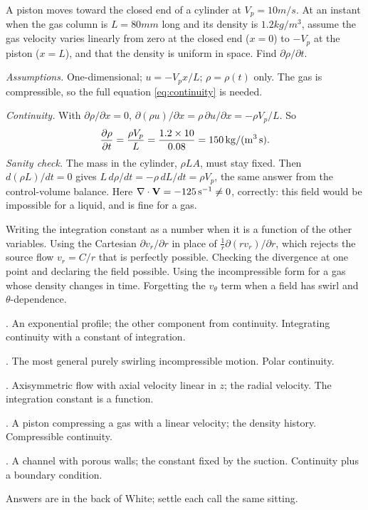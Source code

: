 \begin{example}
A piston moves toward the closed end of a cylinder at $V_p = 10\unit{m/s}$. At an instant when the gas column is $L = 80\unit{mm}$ long and its density is $1.2\unit{kg/m^3}$, assume the gas velocity varies linearly from zero at the closed end ($x = 0$) to $-V_p$ at the piston ($x = L$), and that the density is uniform in space. Find $\partial\rho/\partial t$.

\emph{Assumptions.} One-dimensional; $u = -V_p x/L$; $\rho = \rho(t)$ only. The gas is compressible, so the full equation \eqref{eq:continuity} is needed.

\emph{Continuity.} With $\partial\rho/\partial x = 0$, $\partial(\rho u)/\partial x = \rho\,\partial u/\partial x = -\rho V_p/L$. So
\[
\frac{\partial \rho}{\partial t} = \frac{\rho V_p}{L} = \frac{1.2 \times 10}{0.08} = 150\,\mathrm{kg/(m^3\,s)}.
\]
\emph{Sanity check.} The mass in the cylinder, $\rho L A$, must stay fixed. Then $d(\rho L)/dt = 0$ gives $L\,d\rho/dt = -\rho\,dL/dt = \rho V_p$, the same answer from the control-volume balance. Here $\nabla\cdot\mathbf{V} = -125\,\mathrm{s^{-1}} \ne 0$, correctly: this field would be impossible for a liquid, and is fine for a gas.
\end{example}

\begin{trap}
Writing the integration constant as a number when it is a function of the other variables. Using the Cartesian $\partial v_r/\partial r$ in place of $\frac{1}{r}\partial(r v_r)/\partial r$, which rejects the source flow $v_r = C/r$ that is perfectly possible. Checking the divergence at one point and declaring the field possible. Using the incompressible form for a gas whose density changes in time. Forgetting the $v_\theta$ term when a field has swirl and $\theta$-dependence.
\end{trap}

\begin{ladder}
\item {}. An exponential profile; the other component from continuity. Integrating continuity with a constant of integration.
\item {}. The most general purely swirling incompressible motion. Polar continuity.
\item {}. Axisymmetric flow with axial velocity linear in $z$; the radial velocity. The integration constant is a function.
\item {}. A piston compressing a gas with a linear velocity; the density history. Compressible continuity.
\item {}. A channel with porous walls; the constant fixed by the suction. Continuity plus a boundary condition.
\end{ladder}
Answers are in the back of White; settle each call the same sitting.


